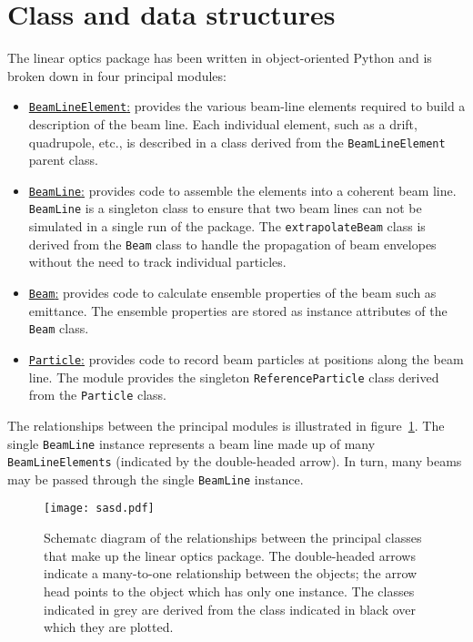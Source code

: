 \graphicspath{ {A1-MCD/Figures/} }

\section{Class and data structures}
\label{App:A1}

The linear optics package has been written in object-oriented Python
and is broken down in four principal modules:
\begin{itemize}
  \item \underline{\texttt{BeamLineElement}:} provides the various
    beam-line elements required to build a description of the beam
    line.
    Each individual element, such as a drift, quadrupole, etc., is
    described in a class derived from the \texttt{BeamLineElement}
    parent class.
  \item \underline{\texttt{BeamLine}:} provides code to assemble the
    elements into a coherent beam line.
    \texttt{BeamLine} is a singleton class to ensure that two beam
    lines can not be simulated in a single run of the package.
    The \texttt{extrapolateBeam} class is derived from
    the \texttt{Beam} class to handle the propagation of beam
    envelopes without the need to track individual particles.
  \item \underline{\texttt{Beam}:} provides code to calculate
    ensemble properties of the beam such as emittance.
    The ensemble properties are stored as instance attributes of
    the \texttt{Beam} class.
  \item \underline{\texttt{Particle}:} provides code to record beam
    particles at positions along the beam line.
    The module provides the singleton \texttt{ReferenceParticle}
    class derived from the \texttt{Particle} class.
\end{itemize}
The relationships between the principal modules is illustrated in
figure~\ref{App:Fig:SASD}.
The single \texttt{BeamLine} instance represents a beam line made up
of many \texttt{BeamLineElements} (indicated by the double-headed
arrow).
In turn, many beams may be passed through the single \texttt{BeamLine}
instance.
\begin{figure}
  \begin{center}
    \texttt{[image: sasd.pdf]}
  \end{center}
  \caption{
    Schematc diagram of the relationships between the principal
    classes that make up the linear optics package.
    The double-headed arrows indicate a many-to-one relationship
    between the objects; the arrow head points to the object which
    has only one instance.
    The classes indicated in grey are derived from the class indicated
    in black over which they are plotted.
  }
  \label{App:Fig:SASD}
\end{figure}

